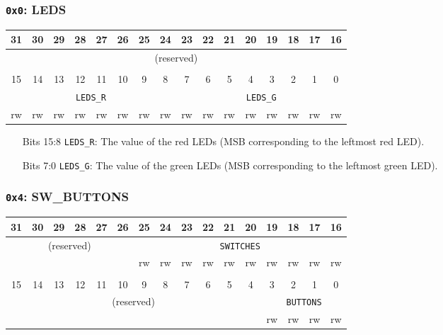 \documentclass[11pt,openany]{report}
\begin{document}
\subsubsection{\texttt{0x0}: LEDS}
\begin{center}
  \begin{tabular}{|c|c|c|c|c|c|c|c|c|c|c|c|c|c|c|c|}
    \hline
    31 & 30 & 29 & 28 & 27 & 26 & 25 & 24 & 23 & 22 & 21 & 20 & 19 & 18 & 17 & 16 \\
    \hline
    \multicolumn{16}{|c|}{\multirow{2}{*}{(reserved)}}\\
    \multicolumn{16}{|c|}{}
    \\
    \hline
    \multicolumn{16}{c}{}\\
    \hline
    15 & 14 & 13 & 12 & 11 & 10 & 9 & 8 & 7 & 6 & 5 & 4 & 3 & 2 & 1 & 0 \\
    \hline
    \multicolumn{8}{|c|}{\texttt{LEDS\_R}} & \multicolumn{8}{c|}{\texttt{LEDS\_G}} \\
    \hline
    rw & rw & rw & rw & rw & rw & rw & rw & rw & rw & rw & rw & rw & rw & rw & rw\\
    \hline
  \end{tabular}
\end{center}

\begin{enumerate}
\item[Bits 15:8] \verb|LEDS_R|: The value of the red LEDs (MSB corresponding to the leftmost red LED).
\item[Bits 7:0] \verb|LEDS_G|: The value of the green LEDs (MSB corresponding to the leftmost green LED).
\end{enumerate}

\subsubsection{\texttt{0x4}: SW\_BUTTONS}
\begin{center}
  \begin{tabular}{|c|c|c|c|c|c|c|c|c|c|c|c|c|c|c|c|}
    \hline
    31 & 30 & 29 & 28 & 27 & 26 & 25 & 24 & 23 & 22 & 21 & 20 & 19 & 18 & 17 & 16 \\
    \hline
    \multicolumn{6}{|c|}{\multirow{2}{*}{(reserved)}} & \multicolumn{10}{c|}{\texttt{SWITCHES}}\\
    \cline{7-16}
    \multicolumn{6}{|c|}{} & rw & rw & rw & rw & rw & rw & rw & rw & rw & rw\\
    \hline
    \multicolumn{16}{c}{}\\
    \hline
    15 & 14 & 13 & 12 & 11 & 10 & 9 & 8 & 7 & 6 & 5 & 4 & 3 & 2 & 1 & 0 \\
    \hline
    \multicolumn{12}{|c|}{\multirow{2}{*}{(reserved)}} & \multicolumn{4}{c|}{\texttt{BUTTONS}} \\
    \cline{13-16}
    \multicolumn{12}{|c|}{} & rw & rw & rw & rw\\
    \hline
  \end{tabular}
\end{center}
\end{document}
